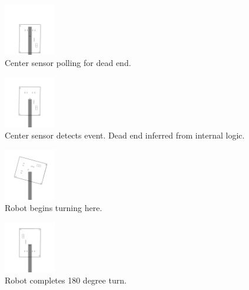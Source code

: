 \vspace{4mm}

\begin{multicols}{4}

\begin{figure}[H]
\centering
\includegraphics[width=0.2\textwidth]{figures/deadend1.png}
\caption{Center sensor polling for dead end.}
\end{figure}

\begin{figure}[H]
\centering
\includegraphics[width=0.2\textwidth]{figures/deadend2.png}
\caption{Center sensor detects event. Dead end inferred from internal logic.}
\end{figure}

\begin{figure}[H]
\centering
\includegraphics[width=0.2\textwidth]{figures/deadend3.png}
\caption{Robot begins turning here.}
\end{figure}

\begin{figure}[H]
\centering
\includegraphics[width=0.2\textwidth]{figures/deadend4.png}
\caption{Robot completes 180 degree turn.}
\end{figure}

\end{multicols}

